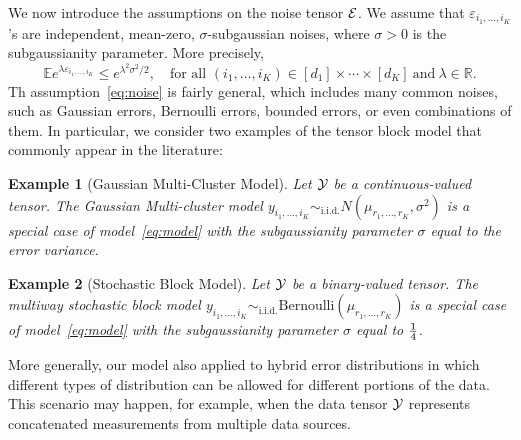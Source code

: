 \documentclass{article}
\newtheorem{exam}{Example}
\begin{document}
We now introduce the assumptions on the noise tensor $\mathcal{E}$. We assume that $\varepsilon_{i_1,\ldots,i_K}$'s are independent, mean-zero, $\sigma$-subgaussian noises, where $\sigma>0$ is the subgaussianity parameter. More precisely, 
\begin{equation}\label{eq:noise}
\mathbb{E}e^{\lambda \varepsilon_{i_1,\ldots,i_K}}\leq e^{\lambda^2\sigma^2/2},\quad \text{for all } (i_1,\ldots,i_K)\in[d_1]\times\cdots\times[d_K] \ \text{and}\ \lambda\in\mathbb{R}.
\end{equation}
Th assumption~\eqref{eq:noise} is fairly general, which includes many common noises, such as Gaussian errors, Bernoulli errors, bounded errors, or even combinations of them. In particular, we consider two examples of the tensor block model that commonly appear in the literature:
\begin{exam}[Gaussian Multi-Cluster Model]
Let $\mathcal{Y}$ be a continuous-valued tensor. The Gaussian Multi-cluster model $y_{i_1,\ldots,i_K}  \sim_{\text{i.i.d.}} N(\mu_{r_1,\ldots,r_K},\sigma^2)$ is a special case of model~\eqref{eq:model} with the subgaussianity parameter $\sigma$ equal to the error variance.
\end{exam}

\begin{exam}[Stochastic Block Model]
Let $\mathcal{Y}$ be a binary-valued tensor. The multiway stochastic block model $y_{i_1,\ldots,i_K}  \sim_{\text{i.i.d.}} \text{Bernoulli}(\mu_{r_1,\ldots,r_K})$ is a special case of model~\eqref{eq:model} with the subgaussianity parameter $\sigma$ equal to ${1\over 4}$.
\end{exam}

More generally, our model also applied to hybrid error distributions in which different types of distribution can be allowed for different portions of the data. This scenario may happen, for example, when the data tensor $\mathcal{Y}$ represents concatenated measurements from multiple data sources. 
\end{document}
